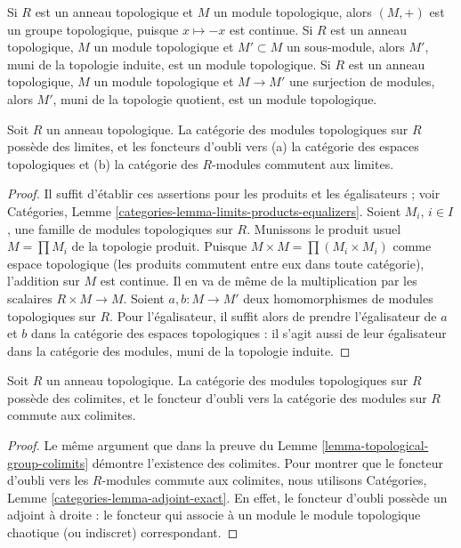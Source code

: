 \noindent
Si $R$ est un anneau topologique et $M$ un module topologique, alors
$(M, +)$ est un groupe topologique, puisque $x \mapsto -x$ est continue.
Si $R$ est un anneau topologique, $M$ un module topologique et
$M' \subset M$ un sous-module, alors $M'$, muni de la topologie induite, est
un module topologique. Si $R$ est un anneau topologique, $M$ un module
topologique et $M \to M'$ une surjection de modules, alors $M'$, muni de la
topologie quotient, est un module topologique.

\begin{lemma}
\label{lemma-topological-module-limits}
Soit $R$ un anneau topologique. La catégorie des modules topologiques sur $R$
possède des limites, et les foncteurs d'oubli vers (a) la catégorie des espaces
topologiques et (b) la catégorie des $R$-modules commutent aux limites.
\end{lemma}

\begin{proof}
Il suffit d'établir ces assertions pour les produits et les égalisateurs ;
voir Catégories, Lemme
\ref{categories-lemma-limits-products-equalizers}. Soient $M_i$, $i \in I$,
une famille de modules topologiques sur $R$. Munissons le produit usuel
$M = \prod M_i$ de la topologie produit. Puisque
$M \times M = \prod (M_i \times M_i)$ comme espace topologique (les produits
commutent entre eux dans toute catégorie), l'addition sur $M$ est continue. Il
en va de même de la multiplication par les scalaires $R \times M \to M$.
Soient $a, b : M \to M'$ deux homomorphismes de modules topologiques sur $R$.
Pour l'égalisateur, il suffit alors de prendre l'égalisateur de $a$ et $b$
dans la catégorie des espaces topologiques : il s'agit aussi de leur
égalisateur dans la catégorie des modules, muni de la topologie induite.
\end{proof}

\begin{lemma}
\label{lemma-topological-module-colimits}
Soit $R$ un anneau topologique. La catégorie des modules topologiques sur $R$
possède des colimites, et le foncteur d'oubli vers la catégorie des modules sur
$R$ commute aux colimites.
\end{lemma}

\begin{proof}
Le même argument que dans la preuve du
Lemme \ref{lemma-topological-group-colimits} démontre l'existence des
colimites. Pour montrer que le foncteur d'oubli vers les $R$-modules commute
aux colimites, nous utilisons Catégories, Lemme
\ref{categories-lemma-adjoint-exact}. En effet, le foncteur d'oubli possède un
adjoint à droite : le foncteur qui associe à un module le module topologique
chaotique (ou indiscret) correspondant.
\end{proof}











